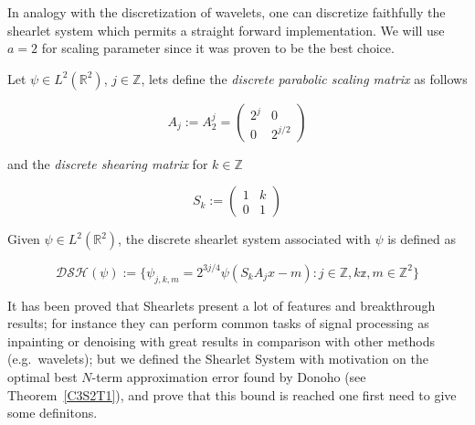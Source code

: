 In analogy with the discretization of wavelets, one can discretize faithfully the shearlet system which permits a straight forward implementation. We will use $a=2$ for scaling parameter since it was proven to be the best choice.

\begin{defn}
Let $\psi\in L^2(\mathbb{R}^2)$, $j\in\mathbb{Z}$, lets define the \textit{discrete parabolic scaling matrix} as follows

\begin{equation}
\label{eq:discscaling}
A_j:= A_2^j =
\left(\begin{matrix}
2^j & 0 \\
0 & 2^{j/2}
\end{matrix}\right)
\end{equation}

and the \textit{discrete shearing matrix} for $k\in\mathbb{Z}$

\begin{equation}
\label{eq:discshearing}
S_k:= 
\left(\begin{matrix}
1 & k \\
0 & 1
\end{matrix}\right) 
\end{equation}

Given $\psi\in L^2(\mathbb{R}^2)$, the discrete shearlet system associated with $\psi$ is defined as

\begin{equation}
\label{eq:discshearletsys}
\mathcal{DSH}(\psi):=\{\psi_{j,k,m}=2^{3j/4}\psi (S_kA_jx-m):j\in\mathbb{Z},k\mathbb{z},m\in\mathbb{Z}^2\}
\end{equation}
\end{defn}

It has been proved that Shearlets present a lot of features and breakthrough results; for instance they can perform common tasks of signal processing as inpainting or denoising with great results in comparison with other methods (e.g.\ wavelets); but we defined the Shearlet System with motivation on the optimal best $N$-term approximation error found by Donoho (see Theorem~\ref{C3S2T1}), and prove that this bound is reached one first need to give some definitons.

